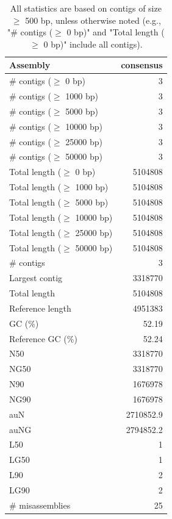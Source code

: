 \documentclass[12pt,a4paper]{article}
\begin{document}
\begin{table}[ht]
\begin{center}
\caption{All statistics are based on contigs of size $\geq$ 500 bp, unless otherwise noted (e.g., "\# contigs ($\geq$ 0 bp)" and "Total length ($\geq$ 0 bp)" include all contigs).}
\begin{tabular}{|l*{1}{|r}|}
\hline
Assembly & consensus \\ \hline
\# contigs ($\geq$ 0 bp) & 3 \\ \hline
\# contigs ($\geq$ 1000 bp) & 3 \\ \hline
\# contigs ($\geq$ 5000 bp) & 3 \\ \hline
\# contigs ($\geq$ 10000 bp) & 3 \\ \hline
\# contigs ($\geq$ 25000 bp) & 3 \\ \hline
\# contigs ($\geq$ 50000 bp) & 3 \\ \hline
Total length ($\geq$ 0 bp) & 5104808 \\ \hline
Total length ($\geq$ 1000 bp) & 5104808 \\ \hline
Total length ($\geq$ 5000 bp) & 5104808 \\ \hline
Total length ($\geq$ 10000 bp) & 5104808 \\ \hline
Total length ($\geq$ 25000 bp) & 5104808 \\ \hline
Total length ($\geq$ 50000 bp) & 5104808 \\ \hline
\# contigs & 3 \\ \hline
Largest contig & 3318770 \\ \hline
Total length & 5104808 \\ \hline
Reference length & 4951383 \\ \hline
GC (\%) & 52.19 \\ \hline
Reference GC (\%) & 52.24 \\ \hline
N50 & 3318770 \\ \hline
NG50 & 3318770 \\ \hline
N90 & 1676978 \\ \hline
NG90 & 1676978 \\ \hline
auN & 2710852.9 \\ \hline
auNG & 2794852.2 \\ \hline
L50 & 1 \\ \hline
LG50 & 1 \\ \hline
L90 & 2 \\ \hline
LG90 & 2 \\ \hline
\# misassemblies & 25 \\ \hline

\end{tabular}
\end{center}
\end{table}
\end{document}
